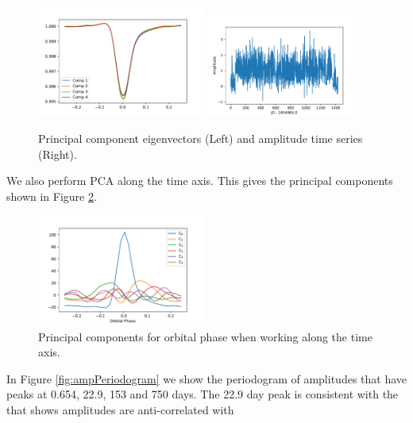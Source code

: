 \documentclass[preprint]{aastex61}
\begin{document}
\begin{figure}[!hbtp]
\begin{centering}
\includegraphics[width=0.49\textwidth]{images/kepler/pca_k1255.pdf}
\includegraphics[width=0.45\textwidth]{images/kepler/amplitude_series.pdf}
\caption{Principal component eigenvectors (Left) and amplitude time series (Right).}\label{fig:PCAamp}
\end{centering}
\end{figure}

We also perform PCA along the time axis.
This gives the principal components shown in Figure \ref{fig:PCAtime}.

\begin{figure}[!hbtp]
\begin{centering}
\includegraphics[width=0.49\textwidth]{images/kepler/pca_time_direction.pdf}
\caption{Principal components for orbital phase when working along the time axis.}\label{fig:PCAtime}
\end{centering}
\end{figure}

In Figure \ref{fig:ampPeriodogram} we show the periodogram of amplitudes that have peaks at 0.654, 22.9, 153 and 750 days.
The 22.9 day peak is consistent with the \citet{kawahara2013starspots} that shows amplitudes are anti-correlated with 
\end{document}
